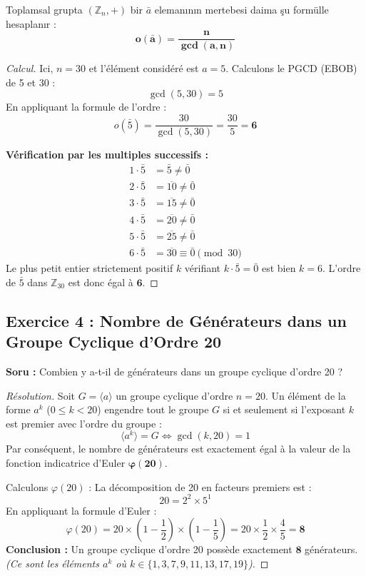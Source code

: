 \documentclass[12pt,a4paper]{report}
\begin{document}
\begin{tcolorbox}[colback=purple!5!white,colframe=purple!75!black,title=Altın Formül : $\mathbb{Z}_n$'de Eleman Mertebesi]
Toplamsal grupta $(\mathbb{Z}_n, +)$ bir $\bar{a}$ elemanının mertebesi daima şu formülle hesaplanır :
\[ \mathbf{o(\bar{a}) = \frac{n}{\gcd(a, n)}} \]
\end{tcolorbox}

\begin{proof}[Calcul]
Ici, $n = 30$ et l'élément considéré est $a = 5$.
Calculons le PGCD (EBOB) de 5 et 30 :
\[ \gcd(5, 30) = 5 \]
En appliquant la formule de l'ordre :
\[ o(\bar{5}) = \frac{30}{\gcd(5, 30)} = \frac{30}{5} = \mathbf{6} \]

\textbf{Vérification par les multiples successifs :}
\begin{align*}
1 \cdot \bar{5} &= \bar{5} \neq \bar{0} \\
2 \cdot \bar{5} &= \overline{10} \neq \bar{0} \\
3 \cdot \bar{5} &= \overline{15} \neq \bar{0} \\
4 \cdot \bar{5} &= \overline{20} \neq \bar{0} \\
5 \cdot \bar{5} &= \overline{25} \neq \bar{0} \\
6 \cdot \bar{5} &= \overline{30} \equiv \bar{0} \pmod{30}
\end{align*}
Le plus petit entier strictement positif $k$ vérifiant $k \cdot \bar{5} = \bar{0}$ est bien $k = 6$.
L'ordre de $\bar{5}$ dans $\mathbb{Z}_{30}$ est donc égal à $\mathbf{6}$.
\end{proof}

\vspace{0.5cm}

\subsection*{Exercice 4 : Nombre de Générateurs dans un Groupe Cyclique d'Ordre 20}
\textbf{Soru :} Combien y a-t-il de générateurs dans un groupe cyclique d'ordre 20 ?

\begin{proof}[Résolution]
Soit $G = \langle a \rangle$ un groupe cyclique d'ordre $n = 20$.  
Un élément de la forme $a^k$ ($0 \leq k < 20$) engendre tout le groupe $G$ si et seulement si l'exposant $k$ est premier avec l'ordre du groupe :
\[ \langle a^k \rangle = G \iff \gcd(k, 20) = 1 \]
Par conséquent, le nombre de générateurs est exactement égal à la valeur de la fonction indicatrice d'Euler $\mathbf{\varphi(20)}$.

Calculons $\varphi(20)$ :
La décomposition de 20 en facteurs premiers est :
\[ 20 = 2^2 \times 5^1 \]
En appliquant la formule d'Euler :
\[ \varphi(20) = 20 \times \left(1 - \frac{1}{2}\right) \times \left(1 - \frac{1}{5}\right) = 20 \times \frac{1}{2} \times \frac{4}{5} = \mathbf{8} \]
\textbf{Conclusion :} Un groupe cyclique d'ordre 20 possède exactement $\mathbf{8}$ générateurs.  
\textit{(Ce sont les éléments $a^k$ où $k \in \{1, 3, 7, 9, 11, 13, 17, 19\}$)}.
\end{proof}
\end{document}
